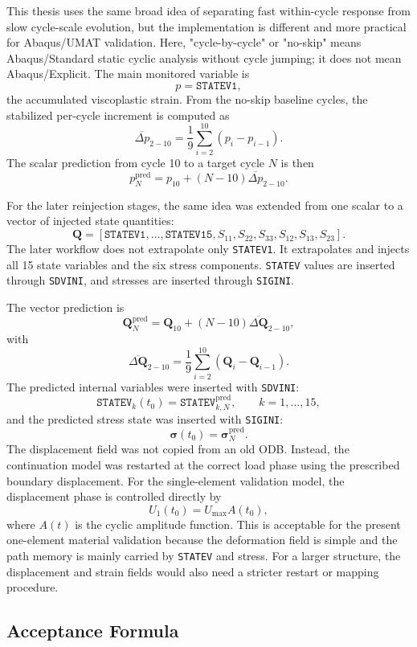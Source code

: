 \documentclass[11pt,a4paper]{article}
\begin{document}
This thesis uses the same broad idea of separating fast within-cycle response from slow cycle-scale evolution, but the implementation is different and more practical for Abaqus/UMAT validation. Here, "cycle-by-cycle" or "no-skip" means Abaqus/Standard static cyclic analysis without cycle jumping; it does not mean Abaqus/Explicit. The main monitored variable is
\[
p = \texttt{STATEV1},
\]
the accumulated viscoplastic strain. From the no-skip baseline cycles, the stabilized per-cycle increment is computed as
\[
\overline{\Delta p}_{2-10}
=
\frac{1}{9}
\sum_{i=2}^{10}
\left(p_i-p_{i-1}\right).
\]
The scalar prediction from cycle 10 to a target cycle $N$ is then
\[
p_N^{\mathrm{pred}}
=
p_{10}
+
\left(N-10\right)\overline{\Delta p}_{2-10}.
\]

For the later reinjection stages, the same idea was extended from one scalar to a vector of injected state quantities:
\[
\mathbf{Q}
=
\left[
\texttt{STATEV1},\ldots,\texttt{STATEV15},
S_{11},S_{22},S_{33},S_{12},S_{13},S_{23}
\right].
\]
The later workflow does not extrapolate only \texttt{STATEV1}. It extrapolates and injects all 15 state variables and the six stress components. \texttt{STATEV} values are inserted through \texttt{SDVINI}, and stresses are inserted through \texttt{SIGINI}.

The vector prediction is
\[
\mathbf{Q}_{N}^{\mathrm{pred}}
=
\mathbf{Q}_{10}
+
\left(N-10\right)
\overline{\Delta\mathbf{Q}}_{2-10},
\]
with
\[
\overline{\Delta\mathbf{Q}}_{2-10}
=
\frac{1}{9}
\sum_{i=2}^{10}
\left(\mathbf{Q}_{i}-\mathbf{Q}_{i-1}\right).
\]
The predicted internal variables were inserted with \texttt{SDVINI}:
\[
\texttt{STATEV}_k(t_0)
=
\texttt{STATEV}_{k,N}^{\mathrm{pred}},
\qquad k=1,\ldots,15,
\]
and the predicted stress state was inserted with \texttt{SIGINI}:
\[
\boldsymbol{\sigma}(t_0)
=
\boldsymbol{\sigma}_{N}^{\mathrm{pred}}.
\]
The displacement field was not copied from an old ODB. Instead, the continuation model was restarted at the correct load phase using the prescribed boundary displacement. For the single-element validation model, the displacement phase is controlled directly by
\[
U_1(t_0)=U_{\max}A(t_0),
\]
where $A(t)$ is the cyclic amplitude function. This is acceptable for the present one-element material validation because the deformation field is simple and the path memory is mainly carried by \texttt{STATEV} and stress. For a larger structure, the displacement and strain fields would also need a stricter restart or mapping procedure.

\subsection{Acceptance Formula}
\end{document}
